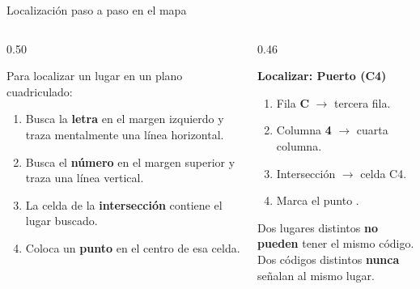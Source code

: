 \documentclass[aspectratio=169, 10pt, spanish]{beamer}
\begin{document}
\begin{frame}{Localización paso a paso en el mapa}
  \begin{columns}[c]
    \begin{column}{0.50\textwidth}
      \begin{teoriabox}
        \AlmFontSmall
        Para localizar un lugar en un plano cuadriculado:
        \begin{enumerate}
          \item Busca la \textbf{letra} en el margen izquierdo
                y traza mentalmente una línea horizontal.
          \item Busca el \textbf{número} en el margen superior
                y traza una línea vertical.
          \item La celda de la \textbf{intersección}
                contiene el lugar buscado.
          \item Coloca un \textbf{punto} en el centro
                de esa celda.
        \end{enumerate}
      \end{teoriabox}
    \end{column}
    \begin{column}{0.46\textwidth}
      \begin{ejemplobox}
        \AlmFontSmall
        \textbf{Localizar: Puerto (C4)}\\[4pt]
        \begin{enumerate}
          \item Fila \textbf{C} $\rightarrow$ tercera fila.
          \item Columna \textbf{4} $\rightarrow$ cuarta columna.
          \item Intersección $\rightarrow$ celda C4.
          \item Marca el punto \textcolor{BAplicar}{\faMapMarkerAlt}.
        \end{enumerate}
      \end{ejemplobox}
      \vspace{6pt}
      \begin{notabox}
        \AlmFontFootnote
        Dos lugares distintos \textbf{no pueden}
        tener el mismo código.\\
        Dos códigos distintos \textbf{nunca} señalan
        al mismo lugar.
      \end{notabox}
    \end{column}
  \end{columns}
\end{frame}
\end{document}
